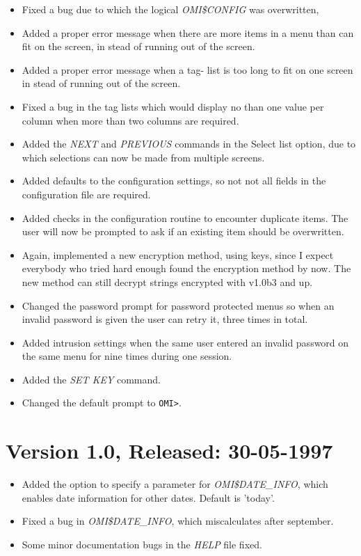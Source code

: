 \documentclass[a4paper]{book}
\newcommand{\gt}{\texttt{>}}
\begin{document}
\begin{itemize}
\item Fixed a bug due to which the logical \textsl{OMI{\$}CONFIG} was overwritten,
\item Added a proper error message when there are more items in a menu than can fit on the screen, in stead of running out of the screen.
\item Added a proper error message when a tag- list is too long to fit on one screen in stead of running out of the screen.
\item Fixed a bug in the tag lists which would display no than one value per column when more than two columns are required.
\item Added the \textsl{NEXT} and \textsl{PREVIOUS} commands in the Select list option, due to which selections can now be made from multiple screens.
\item Added defaults to the configuration settings, so not not all fields in the configuration file are required.
\item Added checks in the configuration routine to encounter duplicate items. The user will now be prompted to ask if an existing item should be overwritten.
\item Again, implemented a new encryption method, using keys, since I expect everybody who tried hard enough found the encryption method by now. The new method can still decrypt strings encrypted with v1.0b3 and up.
\item Changed the password prompt for password protected menus so when an invalid password is given the user can retry it, three times in total.
\item Added intrusion settings when the same user entered an invalid password on the same menu for nine times during one session.
\item Added the \textsl{SET KEY} command.
\item Changed the default prompt to \texttt{OMI\gt}.
\end{itemize}

\section*{Version 1.0, Released: 30-05-1997}

\begin{itemize}
\item Added the option to specify a parameter for \textsl{OMI{\$}DATE{\_}INFO}, which enables date information for other dates. Default is 'today'.
\item Fixed a bug in \textsl{OMI{\$}DATE{\_}INFO}, which miscalculates after september.
\item Some minor documentation bugs in the \textsl{HELP} file fixed.
\end{itemize}
\end{document}
